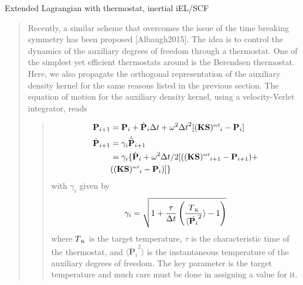 \documentclass[letterpaper,10pt,english]{sphinxmanual}
\begin{document}
Extended Lagrangian with thermostat, inertial iEL/SCF
\begin{quote}

\begin{DUlineblock}{0em}
\item[] Recently, a similar scheme that overcomes the issue of the time
breaking symmetry has been proposed {[}Albaugh2015{]}.
The idea is to control the dynamics of the auxiliary degrees of
freedom through a thermostat. One of the simplest yet efficient
thermostats around is the Berendsen thermostat. Here, we also
propagate the orthogonal representation of the auxiliary density
kernel for the same reasons listed in the previous section. The
equation of motion for the auxiliary density kernel, using a
velocity-Verlet integrator, reads
\end{DUlineblock}
\begin{quote}
\begin{equation*}
\begin{split}\begin{aligned}
\mathbf{P}_{i + 1} &= \mathbf{P}_{i} + \dot{\mathbf{P}}_{i}\Delta t + \omega^2{\Delta t}^2[(\mathbf{KS}){^{\mbox{\tiny{scf}}}}_i - \mathbf{P}_{i}]  \\
\dot{\mathbf{P}}_{i + 1} &= \gamma_i\dot{\widetilde{\mathbf{P}}}_{i + 1} \nonumber \\
 &= \gamma_i \{ \dot{\mathbf{P}}_{i} + \omega^2{\Delta t}/2[((\mathbf{KS}){^{\mbox{\tiny{scf}}}}_{i+1} - \mathbf{P}_{i + 1}) +  \nonumber \\
 &  ((\mathbf{KS}){^{\mbox{\tiny{scf}}}}_i - \mathbf{P}_i)] \}
 \end{aligned}\end{split}
\end{equation*}
with \(\gamma_i\) given by
\begin{equation*}
\begin{split}\gamma_i = \sqrt{1+\frac{\tau}{\Delta t}\left(\frac{T{_{\mbox{\tiny{K}}}}}{ \langle\dot{\mathbf{P}_{i}}^2}\rangle - 1\right)}\end{split}
\end{equation*}
where \(T{_{\mbox{\tiny{K}}}}\) is the target temperature,
\(\tau\) is the characteristic time of the thermostat, and
\(\langle\dot{\mathbf{P}_{i}}^2\rangle\) is the instantaneous
temperature of the auxiliary degrees of freedom. The key parameter
is the target temperature and much care must be done in assigning
a value for it.
\end{quote}
\end{quote}
\end{document}
